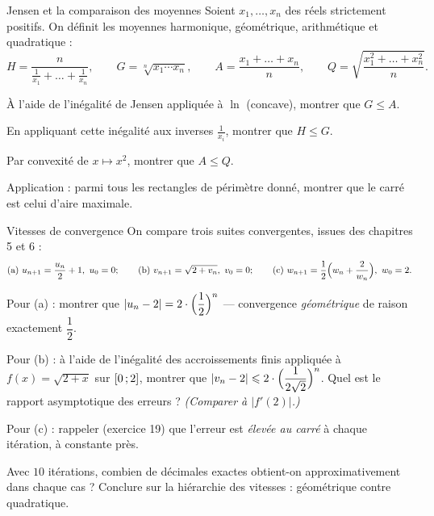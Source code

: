 \begin{exercice}[3]{Jensen et la comparaison des moyennes}
Soient $x_1,\dots,x_n$ des réels strictement positifs. On définit les
moyennes harmonique, géométrique, arithmétique et quadratique :
\[
  H=\frac{n}{\frac{1}{x_1}+\dots+\frac{1}{x_n}},\qquad
  G=\sqrt[n]{x_1\cdots x_n},\qquad
  A=\frac{x_1+\dots+x_n}{n},\qquad
  Q=\sqrt{\frac{x_1^{2}+\dots+x_n^{2}}{n}}.
\]
\begin{questions}
  \item À l'aide de l'inégalité de Jensen appliquée à $\ln$ (concave),
    montrer que $G\leq A$.
  \item En appliquant cette inégalité aux inverses $\frac{1}{x_i}$, montrer
    que $H\leq G$.
  \item Par convexité de $x\mapsto x^{2}$, montrer que $A\leq Q$.
  \item Application : parmi tous les rectangles de périmètre donné, montrer
    que le carré est celui d'aire maximale.
\end{questions}
\end{exercice}

\begin{exercice}[3]{Vitesses de convergence}
On compare trois suites convergentes, issues des chapitres 5 et 6 :
\[
  \text{(a)}\ u_{n+1}=\frac{u_n}{2}+1,\ u_0=0 ;\qquad
  \text{(b)}\ v_{n+1}=\sqrt{2+v_n},\ v_0=0 ;\qquad
  \text{(c)}\ w_{n+1}=\frac12\Bigl(w_n+\frac{2}{w_n}\Bigr),\ w_0=2.
\]
\begin{questions}
  \item Pour (a) : montrer que $|u_n-2|=2\cdot\Bigl(\dfrac12\Bigr)^{n}$ —
    convergence \emph{géométrique} de raison exactement $\dfrac12$.
  \item Pour (b) : à l'aide de l'inégalité des accroissements finis
    appliquée à $f(x)=\sqrt{2+x}$ sur $\intFF{0}{2}$, montrer que
    $|v_n-2|\leq2\cdot\Bigl(\dfrac{1}{2\sqrt2}\Bigr)^{n}$. Quel est le
    rapport asymptotique des erreurs ? \emph{(Comparer à $|f'(2)|$.)}
  \item Pour (c) : rappeler (exercice 19) que l'erreur est \emph{élevée au
    carré} à chaque itération, à constante près.
  \item Avec $10$ itérations, combien de décimales exactes obtient-on
    approximativement dans chaque cas ? Conclure sur la hiérarchie des
    vitesses : géométrique contre quadratique.
\end{questions}
\end{exercice}


